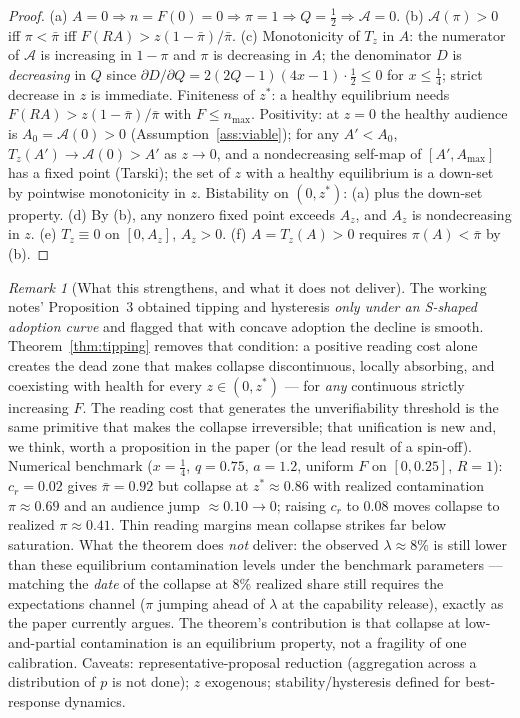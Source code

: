 \documentclass[11pt]{article}
\theoremstyle{remark}
\newtheorem{remark}{Remark}
\begin{document}
\begin{proof}
(a) $A=0\Rightarrow n=F(0)=0\Rightarrow\pi=1\Rightarrow Q=\tfrac12\Rightarrow
\mathcal{A}=0$. (b) $\mathcal{A}(\pi)>0$ iff $\pi<\bar\pi$ iff
$F(RA)>z(1-\bar\pi)/\bar\pi$. (c) Monotonicity of $T_z$ in $A$: the numerator of
$\mathcal{A}$ is increasing in $1-\pi$ and $\pi$ is decreasing in $A$; the
denominator $D$ is \emph{decreasing} in $Q$ since
$\partial D/\partial Q=2(2Q-1)(4x-1)\cdot\tfrac12\le0$ for $x\le\tfrac14$;
strict decrease in $z$ is immediate. Finiteness of $z^*$: a healthy equilibrium
needs $F(RA)>z(1-\bar\pi)/\bar\pi$ with $F\le n_{\max}$. Positivity: at $z=0$
the healthy audience is $A_0=\mathcal{A}(0)>0$ (Assumption~\ref{ass:viable});
for any $A'<A_0$, $T_z(A')\to\mathcal{A}(0)>A'$ as $z\to0$, and a nondecreasing
self-map of $[A',A_{\max}]$ has a fixed point (Tarski); the set of $z$ with a
healthy equilibrium is a down-set by pointwise monotonicity in $z$.
Bistability on $(0,z^*)$: (a) plus the down-set property. (d) By (b), any
nonzero fixed point exceeds $A_z$, and $A_z$ is nondecreasing in $z$.
(e) $T_z\equiv0$ on $[0,A_z]$, $A_z>0$. (f) $A=T_z(A)>0$ requires
$\pi(A)<\bar\pi$ by (b).
\end{proof}

\begin{remark}[What this strengthens, and what it does not deliver]
The working notes' Proposition~3 obtained tipping and hysteresis \emph{only
under an S-shaped adoption curve} and flagged that with concave adoption the
decline is smooth. Theorem~\ref{thm:tipping} removes that condition: a positive
reading cost alone creates the dead zone that makes collapse discontinuous,
locally absorbing, and coexisting with health for every $z\in(0,z^*)$ --- for
\emph{any} continuous strictly increasing $F$. The reading cost that generates
the unverifiability threshold is the same primitive that makes the collapse
irreversible; that unification is new and, we think, worth a proposition in the
paper (or the lead result of a spin-off). Numerical benchmark ($x=\tfrac14$,
$q=0.75$, $a=1.2$, uniform $F$ on $[0,0.25]$, $R=1$): $c_r=0.02$ gives
$\bar\pi=0.92$ but collapse at $z^*\approx0.86$ with realized contamination
$\pi\approx0.69$ and an audience jump $\approx0.10\to0$; raising $c_r$ to
$0.08$ moves collapse to realized $\pi\approx0.41$. Thin reading margins mean
collapse strikes far below saturation. What the theorem does \emph{not} deliver:
the observed $\lambda\approx8\%$ is still lower than these equilibrium
contamination levels under the benchmark parameters --- matching the \emph{date}
of the collapse at 8\% realized share still requires the expectations channel
($\pi$ jumping ahead of $\lambda$ at the capability release), exactly as the
paper currently argues. The theorem's contribution is that collapse at
low-and-partial contamination is an equilibrium property, not a fragility of
one calibration. Caveats: representative-proposal reduction (aggregation across
a distribution of $p$ is not done); $z$ exogenous; stability/hysteresis defined
for best-response dynamics.
\end{remark}
\end{document}
